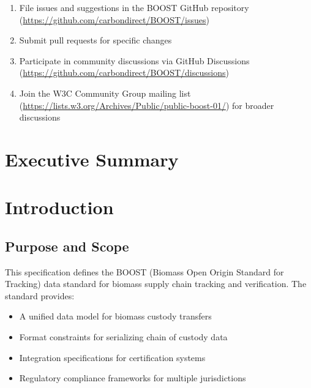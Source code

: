 \documentclass{article}
\begin{document}
\begin{enumerate}
    \item File issues and suggestions in the BOOST GitHub repository (\url{https://github.com/carbondirect/BOOST/issues})
    \item Submit pull requests for specific changes
    \item Participate in community discussions via GitHub Discussions (\url{https://github.com/carbondirect/BOOST/discussions})
    \item Join the W3C Community Group mailing list (\url{https://lists.w3.org/Archives/Public/public-boost-01/}) for broader discussions
\end{enumerate}

\newpage
\tableofcontents

\newpage
\listoftables

\newpage
\listoffigures


\newpage
{}


\section{Executive Summary}
\label{sec:executive-summary}


\section{Introduction}
\label{sec:introduction}


\subsection{Purpose and Scope}
\label{sec:purpose-scope}

This specification defines the BOOST (Biomass Open Origin Standard for Tracking) data standard for biomass supply chain tracking and verification. The standard provides:

\begin{itemize}
    \item A unified data model for biomass custody transfers
    \item Format constraints for serializing chain of custody data
    \item Integration specifications for certification systems
    \item Regulatory compliance frameworks for multiple jurisdictions
\end{itemize}
\end{document}
